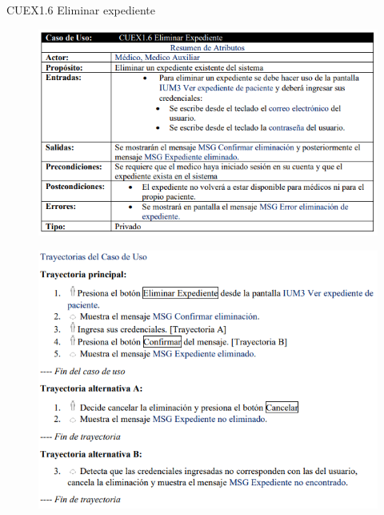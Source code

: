 \documentclass[12pt,letterpaper]{article}
\begin{document}
            \newpage
            CUEX1.6 Eliminar expediente 
            \begin{figure}[H]
                \centering
                \includegraphics [scale=0.8]{specs/specEliminarExpediente}
            \end{figure}
            \begin{figure}[H]
                \centering
                \includegraphics [scale=0.75]{specs/trayEliminarExpediente}
            \end{figure}
\end{document}
